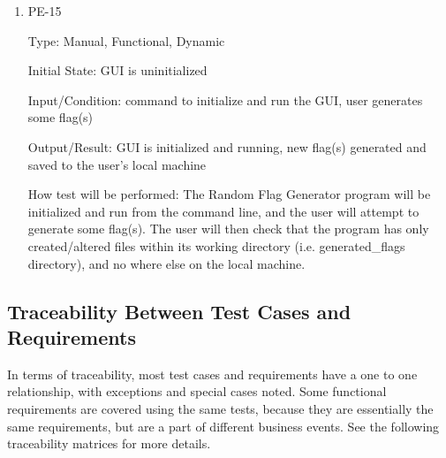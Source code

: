 \documentclass[12pt, titlepage]{article}
\begin{document}
\begin{enumerate}

\item{PE-15\\}

Type: Manual, Functional, Dynamic

Initial State: GUI is uninitialized

Input/Condition: command to initialize and run the GUI, user generates some
flag(s)

Output/Result: GUI is initialized and running, new flag(s) generated and saved
to the user's local machine

How test will be performed: The Random Flag Generator program will be
initialized and run from the command line, and the user will attempt to
generate some flag(s). The user will then check that the program has only
created/altered files within its working directory (i.e. generated\_flags
directory), and no where else on the local machine.

\end{enumerate}

\subsection{Traceability Between Test Cases and Requirements}

In terms of traceability, most test cases and requirements have a one to one
relationship, with exceptions and special cases noted. Some functional
requirements are covered using the same tests, because they are essentially
the same requirements, but are a part of different business events. See the
following traceability matrices for more details.
\end{document}
